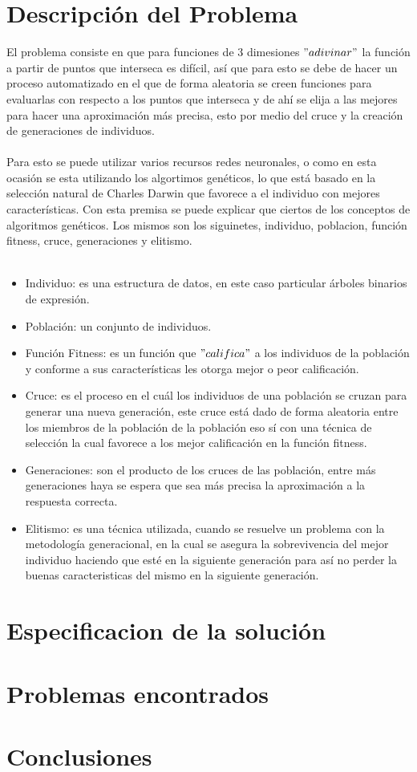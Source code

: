 \documentclass[10pt,a4paper]{article}
\begin{document}
\section{Descripción del Problema}
 El problema consiste en que para funciones de 3 dimesiones  $"adivinar"$ la función a partir de puntos que interseca es
difícil, así que para esto se debe de hacer un proceso automatizado en el que de forma aleatoria se creen funciones para evaluarlas con respecto a los puntos que interseca y de ahí se elija a las mejores para hacer una aproximación más precisa, esto por medio del cruce y la creación de generaciones de individuos.\\\\
Para esto se puede utilizar varios recursos redes neuronales, o como en esta ocasión se esta utilizando los algortimos genéticos, lo que está basado en la selección natural de Charles Darwin que favorece a el individuo con mejores características. Con esta premisa se puede explicar que ciertos de los conceptos de algoritmos genéticos. Los mismos son los siguinetes, individuo, poblacion, función fitness, cruce, generaciones y elitismo. \\\\
\begin{itemize}
\item Individuo: es una estructura de datos, en este caso particular árboles binarios de expresión. \\
\item Población: un conjunto de individuos.\\
\item Función Fitness: es un función que $"califica"$ a los individuos de la población y conforme a sus características les otorga mejor o peor calificación. \\
\item Cruce: es el proceso en el cuál los individuos de una población se cruzan para generar una nueva generación, este cruce está dado de forma aleatoria entre los miembros de la población de la población eso sí con una técnica de selección la cual favorece a los mejor calificación en la función fitness.\\
\item Generaciones: son el producto de los cruces de las población, entre más generaciones haya se espera que sea más precisa la aproximación a la respuesta correcta.\\
\item Elitismo: es una técnica utilizada, cuando se resuelve un problema con la metodología generacional, en la cual se asegura la sobrevivencia del mejor individuo haciendo que esté en la siguiente generación para así no perder la buenas caracteristicas del mismo en la siguiente generación. \\
\end{itemize}






\section{Especificacion de la solución}
	 
\section{Problemas encontrados}
\section{Conclusiones}
\end{document}

